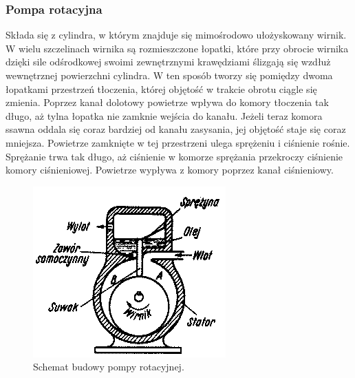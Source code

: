 \documentclass[paper=a4, fontsize=12pt]{scrartcl}
\begin{document}
\subsubsection{Pompa rotacyjna}
Składa się z cylindra, w którym znajduje się mimośrodowo ułożyskowany wirnik. W wielu szczelinach  wirnika są rozmieszczone łopatki, które przy obrocie wirnika dzięki sile odśrodkowej swoimi zewnętrznymi krawędziami ślizgają się wzdłuż wewnętrznej powierzchni cylindra. W ten sposób tworzy się pomiędzy dwoma łopatkami przestrzeń tłoczenia, której objętość w trakcie obrotu ciągle się zmienia. Poprzez kanał dolotowy powietrze wpływa do komory tłoczenia tak długo, aż tylna łopatka nie zamknie wejścia do kanału. Jeżeli teraz komora ssawna oddala się coraz bardziej od kanału zasysania, jej objętość staje się coraz mniejsza. Powietrze zamknięte w tej przestrzeni ulega sprężeniu i ciśnienie rośnie. Sprężanie trwa tak długo, aż ciśnienie w komorze sprężania przekroczy ciśnienie komory ciśnieniowej. Powietrze wypływa z komory poprzez kanał ciśnieniowy.
\begin{figure}[h!]
\centering
\includegraphics[width=0.4\linewidth]{rot2}
\caption{Schemat budowy pompy rotacyjnej.}
\label{fig:rot2}
\end{figure}
\end{document}
